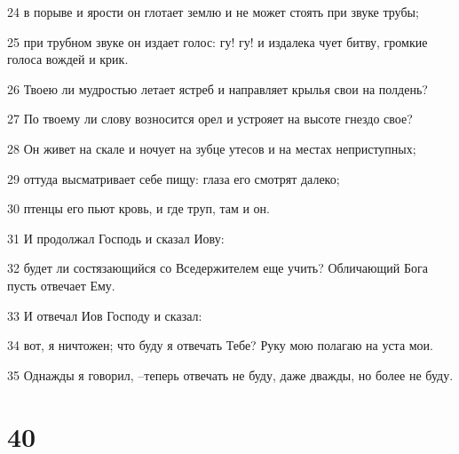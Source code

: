\par 24 в порыве и ярости он глотает землю и не может стоять при звуке трубы;
\par 25 при трубном звуке он издает голос: гу! гу! и издалека чует битву, громкие голоса вождей и крик.
\par 26 Твоею ли мудростью летает ястреб и направляет крылья свои на полдень?
\par 27 По твоему ли слову возносится орел и устрояет на высоте гнездо свое?
\par 28 Он живет на скале и ночует на зубце утесов и на местах неприступных;
\par 29 оттуда высматривает себе пищу: глаза его смотрят далеко;
\par 30 птенцы его пьют кровь, и где труп, там и он.
\par 31 И продолжал Господь и сказал Иову:
\par 32 будет ли состязающийся со Вседержителем еще учить? Обличающий Бога пусть отвечает Ему.
\par 33 И отвечал Иов Господу и сказал:
\par 34 вот, я ничтожен; что буду я отвечать Тебе? Руку мою полагаю на уста мои.
\par 35 Однажды я говорил, --теперь отвечать не буду, даже дважды, но более не буду.

\chapter{40}

